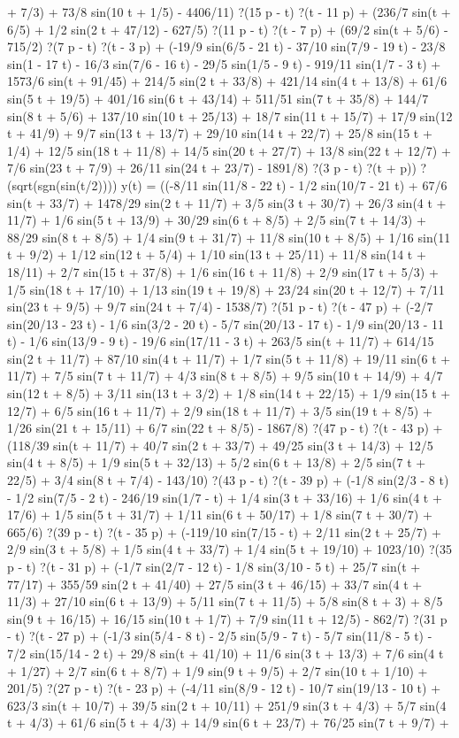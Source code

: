 + 7/3) + 73/8 sin(10 t + 1/5) - 4406/11) ?(15 p - t) ?(t - 11 p) + (236/7 sin(t + 6/5) + 1/2 sin(2 t + 47/12) - 627/5) ?(11 p - t) ?(t - 7 p) + (69/2 sin(t + 5/6) - 715/2) ?(7 p - t) ?(t - 3 p) + (-19/9 sin(6/5 - 21 t) - 37/10 sin(7/9 - 19 t) - 23/8 sin(1 - 17 t) - 16/3 sin(7/6 - 16 t) - 29/5 sin(1/5 - 9 t) - 919/11 sin(1/7 - 3 t) + 1573/6 sin(t + 91/45) + 214/5 sin(2 t + 33/8) + 421/14 sin(4 t + 13/8) + 61/6 sin(5 t + 19/5) + 401/16 sin(6 t + 43/14) + 511/51 sin(7 t + 35/8) + 144/7 sin(8 t + 5/6) + 137/10 sin(10 t + 25/13) + 18/7 sin(11 t + 15/7) + 17/9 sin(12 t + 41/9) + 9/7 sin(13 t + 13/7) + 29/10 sin(14 t + 22/7) + 25/8 sin(15 t + 1/4) + 12/5 sin(18 t + 11/8) + 14/5 sin(20 t + 27/7) + 13/8 sin(22 t + 12/7) + 7/6 sin(23 t + 7/9) + 26/11 sin(24 t + 23/7) - 1891/8) ?(3 p - t) ?(t + p)) ?(sqrt(sgn(sin(t/2))))
y(t) = ((-8/11 sin(11/8 - 22 t) - 1/2 sin(10/7 - 21 t) + 67/6 sin(t + 33/7) + 1478/29 sin(2 t + 11/7) + 3/5 sin(3 t + 30/7) + 26/3 sin(4 t + 11/7) + 1/6 sin(5 t + 13/9) + 30/29 sin(6 t + 8/5) + 2/5 sin(7 t + 14/3) + 88/29 sin(8 t + 8/5) + 1/4 sin(9 t + 31/7) + 11/8 sin(10 t + 8/5) + 1/16 sin(11 t + 9/2) + 1/12 sin(12 t + 5/4) + 1/10 sin(13 t + 25/11) + 11/8 sin(14 t + 18/11) + 2/7 sin(15 t + 37/8) + 1/6 sin(16 t + 11/8) + 2/9 sin(17 t + 5/3) + 1/5 sin(18 t + 17/10) + 1/13 sin(19 t + 19/8) + 23/24 sin(20 t + 12/7) + 7/11 sin(23 t + 9/5) + 9/7 sin(24 t + 7/4) - 1538/7) ?(51 p - t) ?(t - 47 p) + (-2/7 sin(20/13 - 23 t) - 1/6 sin(3/2 - 20 t) - 5/7 sin(20/13 - 17 t) - 1/9 sin(20/13 - 11 t) - 1/6 sin(13/9 - 9 t) - 19/6 sin(17/11 - 3 t) + 263/5 sin(t + 11/7) + 614/15 sin(2 t + 11/7) + 87/10 sin(4 t + 11/7) + 1/7 sin(5 t + 11/8) + 19/11 sin(6 t + 11/7) + 7/5 sin(7 t + 11/7) + 4/3 sin(8 t + 8/5) + 9/5 sin(10 t + 14/9) + 4/7 sin(12 t + 8/5) + 3/11 sin(13 t + 3/2) + 1/8 sin(14 t + 22/15) + 1/9 sin(15 t + 12/7) + 6/5 sin(16 t + 11/7) + 2/9 sin(18 t + 11/7) + 3/5 sin(19 t + 8/5) + 1/26 sin(21 t + 15/11) + 6/7 sin(22 t + 8/5) - 1867/8) ?(47 p - t) ?(t - 43 p) + (118/39 sin(t + 11/7) + 40/7 sin(2 t + 33/7) + 49/25 sin(3 t + 14/3) + 12/5 sin(4 t + 8/5) + 1/9 sin(5 t + 32/13) + 5/2 sin(6 t + 13/8) + 2/5 sin(7 t + 22/5) + 3/4 sin(8 t + 7/4) - 143/10) ?(43 p - t) ?(t - 39 p) + (-1/8 sin(2/3 - 8 t) - 1/2 sin(7/5 - 2 t) - 246/19 sin(1/7 - t) + 1/4 sin(3 t + 33/16) + 1/6 sin(4 t + 17/6) + 1/5 sin(5 t + 31/7) + 1/11 sin(6 t + 50/17) + 1/8 sin(7 t + 30/7) + 665/6) ?(39 p - t) ?(t - 35 p) + (-119/10 sin(7/15 - t) + 2/11 sin(2 t + 25/7) + 2/9 sin(3 t + 5/8) + 1/5 sin(4 t + 33/7) + 1/4 sin(5 t + 19/10) + 1023/10) ?(35 p - t) ?(t - 31 p) + (-1/7 sin(2/7 - 12 t) - 1/8 sin(3/10 - 5 t) + 25/7 sin(t + 77/17) + 355/59 sin(2 t + 41/40) + 27/5 sin(3 t + 46/15) + 33/7 sin(4 t + 11/3) + 27/10 sin(6 t + 13/9) + 5/11 sin(7 t + 11/5) + 5/8 sin(8 t + 3) + 8/5 sin(9 t + 16/15) + 16/15 sin(10 t + 1/7) + 7/9 sin(11 t + 12/5) - 862/7) ?(31 p - t) ?(t - 27 p) + (-1/3 sin(5/4 - 8 t) - 2/5 sin(5/9 - 7 t) - 5/7 sin(11/8 - 5 t) - 7/2 sin(15/14 - 2 t) + 29/8 sin(t + 41/10) + 11/6 sin(3 t + 13/3) + 7/6 sin(4 t + 1/27) + 2/7 sin(6 t + 8/7) + 1/9 sin(9 t + 9/5) + 2/7 sin(10 t + 1/10) + 201/5) ?(27 p - t) ?(t - 23 p) + (-4/11 sin(8/9 - 12 t) - 10/7 sin(19/13 - 10 t) + 623/3 sin(t + 10/7) + 39/5 sin(2 t + 10/11) + 251/9 sin(3 t + 4/3) + 5/7 sin(4 t + 4/3) + 61/6 sin(5 t + 4/3) + 14/9 sin(6 t + 23/7) + 76/25 sin(7 t + 9/7) + 